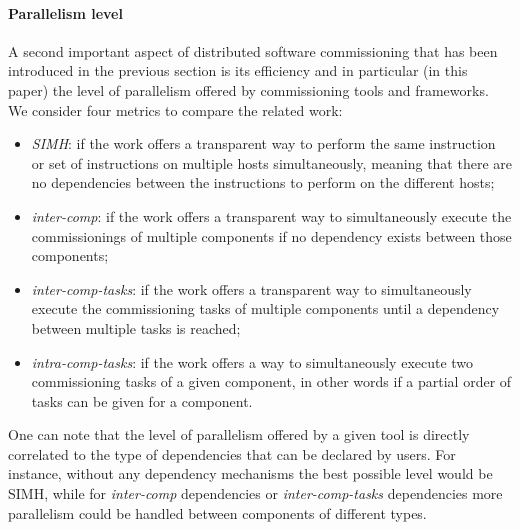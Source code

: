 \paragraph{Parallelism level}
A second important aspect of distributed software commissioning that
has been introduced in the previous section is its efficiency and in
particular (in this paper) the level of parallelism offered by
commissioning tools and frameworks. We consider four metrics to
compare the related work:
\begin{itemize}
\item \emph{SIMH}: if the work offers a transparent way to perform the
  same instruction or set of instructions on multiple hosts
  simultaneously, meaning that there are no dependencies between the
  instructions to perform on the different hosts;
  \item \emph{inter-comp}: if the work offers a transparent way to
    simultaneously execute the commissionings of multiple components
    if no dependency exists between those components;
  \item \emph{inter-comp-tasks}: if the work offers a transparent way to
    simultaneously execute the commissioning tasks of multiple
    components until a dependency between multiple tasks is reached;
  \item \emph{intra-comp-tasks}: if the work offers a way to simultaneously
    execute two commissioning tasks of a given component, in other
    words if a partial order of tasks can be given for a component.
\end{itemize}
One can note that the level of parallelism offered by a given tool is
directly correlated to the type of dependencies that can be declared
by users. For instance, without any dependency mechanisms the best
possible level would be SIMH, while for \emph{inter-comp} dependencies
or \emph{inter-comp-tasks} dependencies more parallelism could be
handled between components of different types.

